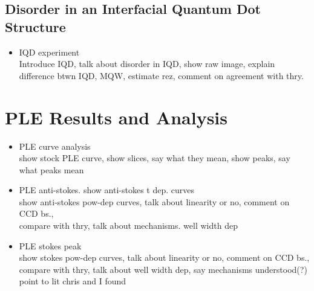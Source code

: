 \subsection{Disorder in an Interfacial Quantum Dot Structure}
\begin{itemize}
\item IQD experiment\\
\* Introduce IQD, talk about disorder in IQD, show raw image, explain difference btwn IQD, MQW, estimate rez, comment on agreement with thry.
\end{itemize}
\section{PLE Results and Analysis}
\begin{itemize}
\item PLE curve analysis\\
show stock PLE curve, show slices, say what they mean, show peaks, say what peaks mean
\item PLE anti-stokes.
show anti-stokes t dep. curves\\
show anti-stokes pow-dep curves, talk about linearity or no, comment on CCD bs., \\
compare with thry, talk about mechanisms. well width dep
\item PLE stokes peak\\
show stokes pow-dep curves, talk about linearity or no, comment on CCD bs., \\
compare with thry, talk about well width dep, say mechanisms understood(?) point to lit chris and I found

\end{itemize}
